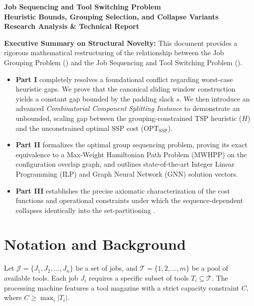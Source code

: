 \documentclass[11pt,a4paper]{article}
\theoremstyle{plain}
\theoremstyle{definition}
\newcommand{\OPT}{\text{OPT}}
\newcommand{\JGP}{\text{JGP}}
\newcommand{\SSP}{\text{SSP}}
\begin{document}
	
	\begin{center}
		{\LARGE \bfseries \color{navyblue} Job Sequencing and Tool Switching Problem} \\[0.3cm]
		{\large \bfseries \color{midblue} Heuristic Bounds, Grouping Selection, and Collapse Variants} \\[0.6cm]
		\textbf{Research Analysis \& Technical Report}
	\end{center}
	
	\vspace{0.4cm}
	
	\begin{mdframed}[backgroundcolor=verylightblue,linecolor=midblue,linewidth=1pt,roundcorner=4pt]
		\textbf{Executive Summary on Structural Novelty:}
		This document provides a rigorous mathematical restructuring of the relationship between the Job Grouping Problem (\JGP) and the Job Sequencing and Tool Switching Problem (\SSP). 
		\begin{itemize}[leftmargin=1.5em,topsep=0.2pt,itemsep=2pt]
			\item \textbf{Part I} completely resolves a foundational conflict regarding worst-case heuristic gaps. We prove that the canonical sliding window construction yields a constant gap bounded by the padding slack $s$. We then introduce an advanced \textit{Combinatorial Component Splitting Instance} to demonstrate an unbounded, scaling gap between the grouping-constrained TSP heuristic ($H$) and the unconstrained optimal SSP cost ($\OPT_{\SSP}$).
			\item \textbf{Part II} formalizes the optimal group sequencing problem, proving its exact equivalence to a Max-Weight Hamiltonian Path Problem (MWHPP) on the configuration overlap graph, and outlines state-of-the-art Integer Linear Programming (ILP) and Graph Neural Network (GNN) solution vectors.
			\item \textbf{Part III} establishes the precise axiomatic characterization of the cost functions and operational constraints under which the sequence-dependent \SSP{} collapses identically into the set-partitioning \JGP{}.
		\end{itemize}
	\end{mdframed}
	
	\section{Notation and Background}
	Let $\mathcal{J} = \{J_1, J_2, \dots, J_n\}$ be a set of jobs, and $\mathcal{T} = \{1, 2, \dots, m\}$ be a pool of available tools. Each job $J_i$ requires a specific subset of tools $T_i \subseteq \mathcal{T}$. The processing machine features a tool magazine with a strict capacity constraint $C$, where $C \ge \max_{i} |T_i|$. 
	
\end{document}
